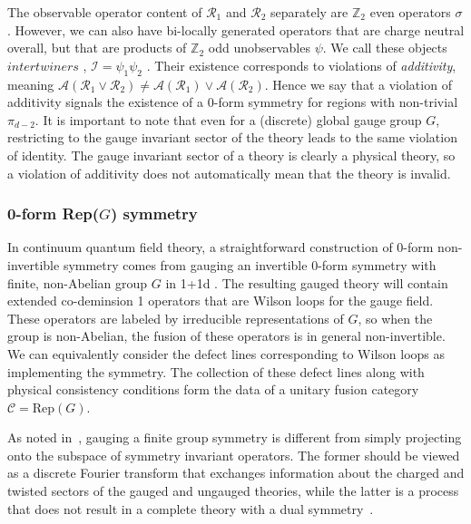 \documentclass{article}
\newcommand{\mA}{\mathcal{A}}
\theoremstyle{definition}
\begin{document}
  The observable operator content of $\mathcal{R}_{1}$ and $\mathcal{R}_{2}$
  separately are $\mathbb{Z}_{2}$ even operators $\sigma$. However, we can also
  have bi-locally generated operators that are charge neutral overall, but that are
  products of $\mathbb{Z}_{2}$ odd unobservables $\psi$. We call these objects
  $\textit{intertwiners }$, $\mathcal{I}= \psi_{1}\psi_{2}$ . Their existence corresponds
  to violations of \textit{additivity}, meaning $\mA(\mathcal{R}_{1}\vee \mathcal{R}
  _{2}) \neq \mA(\mathcal{R}_{1}) \vee \mA(\mathcal{R}_{2})$. Hence we say that
  a violation of additivity signals the existence of a 0-form symmetry for
  regions with non-trivial $\pi_{d-2}$. It is important to note that even for a (discrete)
  global gauge group $G$, restricting to the gauge invariant sector of the
  theory leads to the same violation of identity. The gauge invariant sector of a
  theory is clearly a physical theory, so a violation of additivity does not
  automatically mean that the theory is invalid.

  \subsubsection{0-form Rep($G$) symmetry}
  \label{sec:repgcont} In continuum quantum field theory, a straightforward construction
  of 0-form non-invertible symmetry comes from gauging an invertible 0-form symmetry
  with finite, non-Abelian group $G$ in 1+1d
  \cite{bhardwaj2018gaugingfinitesymmetries}. The resulting gauged theory will contain
  extended co-deminsion 1 operators that are Wilson loops for the gauge field.
  These operators are labeled by irreducible representations of $G$, so when the
  group is non-Abelian, the fusion of these operators is in general non-invertible.
  We can equivalently consider the defect lines corresponding to Wilson loops as
  implementing the symmetry. The collection of these defect lines along with
  physical consistency conditions form the data of a unitary fusion category
  $\mathcal{C}= \text{Rep}(G)$.

  As noted in~\cite{harlow2025disjointadditivitylocalquantum}, gauging a finite group
  symmetry is different from simply projecting onto the subspace of symmetry invariant
  operators. The former should be viewed as a discrete Fourier transform that
  exchanges information about the charged and twisted sectors of the gauged and
  ungauged theories, while the latter is a process that does not result in a complete
  theory with a dual symmetry~\cite{bhardwaj2018gaugingfinitesymmetries, bhardwaj2023lecturesgeneralizedsymmetries}.
\end{document}
